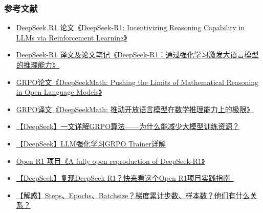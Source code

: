 \documentclass[10pt,aspectratio=169]{beamer}
\begin{document}
\begin{frame}
    \frametitle{参考文献}
    {\small
    \begin{itemize}
        \item \href{https://arxiv.org/abs/2501.12948}{DeepSeek R1 论文《DeepSeek-R1: Incentivizing Reasoning Capability in LLMs via Reinforcement Learning》}
        \item \href{https://blog.csdn.net/qq_38961840/article/details/145556531}{DeepSeek-R1 译文及论文笔记《DeepSeek-R1：通过强化学习激发大语言模型的推理能力》}
        \item \href{https://arxiv.org/abs/2402.03300}{GRPO论文《DeepSeekMath: Pushing the Limits of Mathematical Reasoning in Open Language Models》}
        \item \href{https://blog.csdn.net/qq_38961840/article/details/145384346}{GRPO译文《DeepSeekMath: 推动开放语言模型在数学推理能力上的极限》}
        \item \href{https://blog.csdn.net/qq_38961840/article/details/145384852}{【DeepSeek】一文详解GRPO算法——为什么能减少大模型训练资源？}
        \item \href{https://blog.csdn.net/qq_38961840/article/details/145387854}{【DeepSeek】LLM强化学习GRPO Trainer详解}
        \item \href{https://github.com/huggingface/open-r1}{Open R1 项目《A fully open reproduction of DeepSeek-R1》}
        \item \href{https://blog.csdn.net/qq_38961840/article/details/145388142}{【DeepSeek】复现DeepSeek R1？快来看这个Open R1项目实践指南~}
        \item \href{https://blog.csdn.net/qq_38961840/article/details/145559997}{【解惑】Steps、Epochs、Batchsize？梯度累计步数、样本数？他们有什么关系？}
    \end{itemize}
    }
\end{frame}
\end{document}
